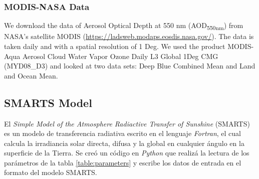 \subsubsection{MODIS-NASA Data}
We download the data of Aerosol Optical Depth at 550 nm (AOD\textsubscript{550nm}) from NASA’s
satellite MODIS (\url{https://ladsweb.modaps.eosdis.nasa.gov/}). The data is taken daily and with a spatial
resolution of 1 Deg. We used the product MODIS-Aqua Aerosol Cloud Water Vapor Ozone Daily L3 Global 1Deg CMG
(MYD08\_D3) and looked at two data sets: Deep Blue Combined Mean and Land and Ocean Mean. 
\subsection{SMARTS Model}
El \textit{Simple Model of the Atmosphere Radiactive Transfer of Sunshine} (SMARTS) es un modelo de transferencia radiativa
escrito en el lenguaje \textit{Fortran}, el cual calcula la irradiancia solar directa, difusa y la 
global en cualquier ángulo en la superficie de la Tierra. Se creó un código en
\textit{Python} que realizá la lectura de los parámetros de la tabla \ref{table:parameters} y escribe los datos de entrada 
en el formato del modelo SMARTS. 

